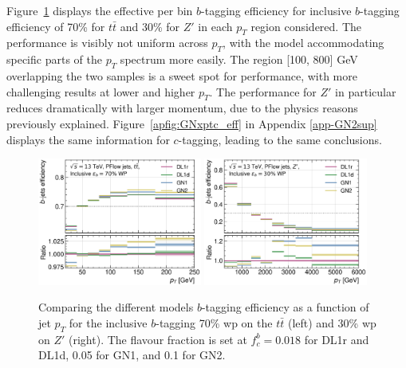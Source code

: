 Figure~\ref{fig:GNxptb_eff} displays the effective per bin $b$-tagging efficiency for inclusive $b$-tagging efficiency of 70\% for $t\bar{t}$ and 30\% for $Z'$ in each $p_T$ region considered. The performance is visibly not uniform across $p_T$, with the model accommodating specific parts of the $p_T$ spectrum more easily. The region [100, 800] GeV overlapping the two samples is a sweet spot for performance, with more challenging results at lower and higher $p_T$. The performance for $Z'$ in particular reduces dramatically with larger momentum, due to the physics reasons previously explained. Figure~\ref{apfig:GNxptc_eff} in Appendix \ref{app-GN2sup} displays the same information for $c$-tagging, leading to the same conclusions. 
\begin{figure}[h!]
  \centering
  \includegraphics[width=0.48\textwidth]{Images/FTAG/GN/GN2/pt_plots/pt_ttbar_b_eff.png}
  \includegraphics[width=0.48\textwidth]{Images/FTAG/GN/GN2/pt_plots/pt_zp_b_eff.png}
  \caption{Comparing the different models $b$-tagging efficiency as a function of jet $p_T$ for the inclusive $b$-tagging 70\% \gls{wp} on the $t\bar{t}$ (left) and 30\% \gls{wp} on $Z'$ (right). The flavour fraction is set at $f^b_c = 0.018$ for DL1r and DL1d, 0.05 for GN1, and 0.1 for GN2.}
  \label{fig:GNxptb_eff}
\end{figure} 

